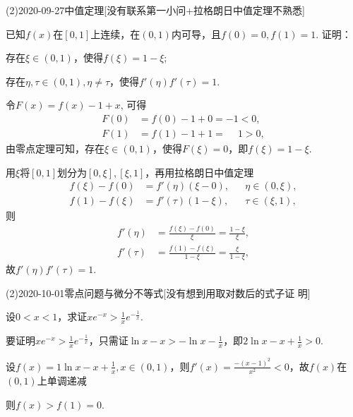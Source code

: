 \documentclass{ctexart}
\begin{document}
\begin{mathques}(2){2020-09-27}{中值定理}[没有联系第一小问+拉格朗日中值定理不熟悉]
\begin{ques}
  已知$f(x)$在$[0, 1]$上连续，在$(0, 1)$内可导，且$f(0) = 0, f(1) = 1$. 证明：
  \begin{queslist}
    \item 存在$\xi \in (0, 1)$，使得$f(\xi) = 1 - \xi$;
    \item 存在$\eta , \tau \in (0, 1), \eta \neq \tau$，使得$f'(\eta)f'(\tau)
      = 1.$
  \end{queslist}
\end{ques}
\begin{solu}
\begin{solulist}
  \item 令$F(x) = f(x) - 1 + x$, 可得
    \begin{align*}
      F(0) &= f(0) - 1 + 0 = -1 < 0,\\
      F(1) &= f(1) - 1 + 1 = \phantom{-}1 > 0,
    \end{align*}
    由零点定理可知，存在$\xi \in (0, 1)$，使得$F(\xi) = 0$，即$f(\xi) = 1 -
    \xi$.
  \item 用$\xi$将$[0, 1]$划分为$[0, \xi], [\xi, 1]$，再用拉格朗日中值定理
    \begin{align*}
      f(\xi) - f(0) &= f'(\eta)(\xi - 0), & &\eta \in (0, \xi),\\
      f(1) - f(\xi) &= f'(\tau)(1 - \xi), & &\tau \in (\xi, 1),
    \end{align*}
    则
    \begin{align*}
      f'(\eta) &= \frac{f(\xi) - f(0)}{\xi} = \frac{1 - \xi}{\xi}, \\
      f'(\tau) &= \frac{f(1) - f(\xi)}{ 1 - \xi } = \frac{\xi}{1 - \xi},
    \end{align*}
    故$f'(\eta)f'(\tau) = 1$.
\end{solulist}
\end{solu}
\end{mathques}

\begin{mathques}(2){2020-10-01}{零点问题与微分不等式}[没有想到用取对数后的式子证
  明]
\begin{ques}
设$0 < x < 1$，求证$xe^{-x} > \frac{1}{x} e^{-\frac{1}{x}}$.
\end{ques}
\begin{solu}
  \mathproof 要证明$xe^{-x} > \frac{1}{x} e^{-\frac{1}{x}}$，只需证$\ln x - x
  > -\ln x - \frac{1}{x}$，即$2\ln x -x + \frac{1}{x} > 0$.

  设$f(x) = 1\ln x - x + \frac{1}{x}, x \in (0, 1)$，则$f'(x) = \frac{-(x -
  1)^2}{x^2} < 0$，故$f(x)$在$(0, 1)$上单调递减

  则$f(x) > f(1) = 0$.
\end{solu}
\end{mathques}
\end{document}
